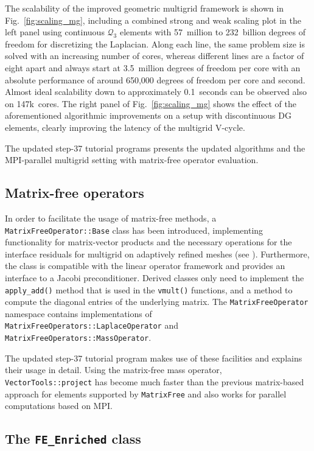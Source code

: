 \documentclass{ansarticle-preprint}
\begin{document}
The scalability of the improved geometric multigrid framework is shown in
Fig.~\ref{fig:scaling_mg}, including a combined strong and weak scaling plot
in the left panel using continuous $\mathcal Q_3$ elements with 57~million to
232~billion degrees of freedom for discretizing the Laplacian. Along each
line, the same problem size is solved with an increasing number of cores,
whereas different lines are a factor of eight apart and always start at
3.5~million degrees of freedom per core with an absolute performance of around
650,000 degrees of freedom per core and second. Almost ideal scalability down
to approximately 0.1~seconds can be observed also on 147k~cores. The right
panel of Fig.~\ref{fig:scaling_mg} shows the effect of the aforementioned
algorithmic improvements on a setup with discontinuous DG elements, clearly
improving the latency of the multigrid V-cycle.

The updated step-37 tutorial
programs presents the updated algorithms and the MPI-parallel multigrid
setting with matrix-free operator evaluation.



\subsection{Matrix-free operators}

In order to facilitate the usage of matrix-free methods, a
\verb!MatrixFreeOperator::Base! class has been introduced, implementing
functionality for matrix-vector products and the necessary operations
for the interface residuals for multigrid on adaptively refined meshes
(see \cite{JanssenKanschat2011}). Furthermore, the class is compatible
with the linear operator framework and provides an interface to a Jacobi
preconditioner. Derived classes only need to implement the
\verb!apply_add()! method that is used in the \verb!vmult()! functions, and
a method to compute the diagonal entries of the underlying matrix. The
\verb!MatrixFreeOperator! namespace contains implementations of
\verb!MatrixFreeOperators::LaplaceOperator! and
\verb!MatrixFreeOperators::MassOperator!.

The updated step-37 tutorial
program makes use of these facilities and explains their usage in detail.
Using the matrix-free mass operator, \verb!VectorTools::project! has become
much faster than the previous matrix-based approach for elements supported
by \verb!MatrixFree! and also works for parallel computations based on MPI.


\subsection{The \texttt{FE\_Enriched} class}
\end{document}
